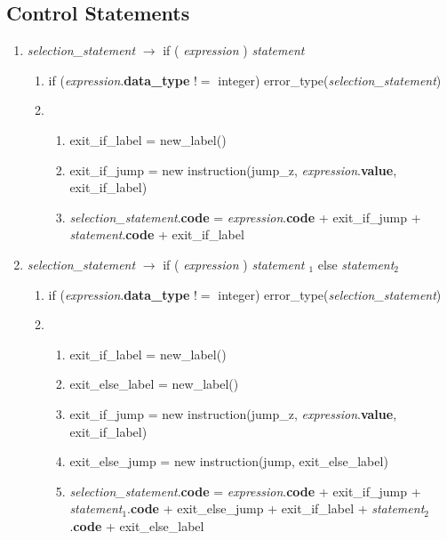 \documentclass[12pt]{article}
\newcommand{\sub}[1]{$_{#1}$}
\begin{document}
\subsection{Control Statements}
\begin{enumerate}[label = \arabic*.]

\item \textit{ selection\_statement } $\rightarrow$ if (\textit{ expression} ) \textit{ statement }
\begin{enumerate}[label = \roman*.]
\item if (\textit{expression}.\textbf{data\_type} $!=$ integer) error\_type(\textit{selection\_statement})
\item \begin{enumerate}[label = \alph*.]
\item exit\_if\_label = new\_label()
\item exit\_if\_jump = new instruction(jump\_z, \textit{expression}.\textbf{value}, exit\_if\_label)
\item \textit{selection\_statement}.\textbf{code} = \textit{expression}.\textbf{code} + exit\_if\_jump + \textit{statement}.\textbf{code} + exit\_if\_label
\end{enumerate}
\end{enumerate}

\item \textit{ selection\_statement } $\rightarrow$ if (\textit{ expression} ) \textit{ statement \sub{1}} else \textit{ statement\sub{2}} 
\begin{enumerate}[label = \roman*.]
\item if (\textit{expression}.\textbf{data\_type} $!=$ integer) error\_type(\textit{selection\_statement})
\item \begin{enumerate}[label = \alph*.]
\item exit\_if\_label = new\_label()
\item exit\_else\_label = new\_label()
\item exit\_if\_jump = new instruction(jump\_z, \textit{expression}.\textbf{value}, exit\_if\_label)
\item exit\_else\_jump = new instruction(jump, exit\_else\_label)
\item \textit{selection\_statement}.\textbf{code} = \textit{expression}.\textbf{code} + exit\_if\_jump + \textit{statement}\sub{1}.\textbf{code} + exit\_else\_jump + exit\_if\_label + \textit{statement}\sub{2}.\textbf{code} + exit\_else\_label
\end{enumerate}
\end{enumerate}


\end{enumerate}
\end{document}
